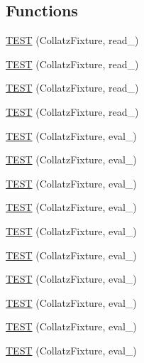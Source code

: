 \subsection*{Functions}
\begin{DoxyCompactItemize}
\item 
\hyperlink{bmk447-TestCollatz_8c_09_09_a66f4163404a0842f4f9eb6dcbfb35580}{T\-E\-S\-T} (Collatz\-Fixture, read\-\_)
\item 
\hyperlink{bmk447-TestCollatz_8c_09_09_a3187ab2baa687bc11ef1402f3c5ac249}{T\-E\-S\-T} (Collatz\-Fixture, read\-\_)
\item 
\hyperlink{bmk447-TestCollatz_8c_09_09_a910fd6352964fadd13f189dfb49f46f4}{T\-E\-S\-T} (Collatz\-Fixture, read\-\_)
\item 
\hyperlink{bmk447-TestCollatz_8c_09_09_a0b5a76cb98b330891857af6177a4ee52}{T\-E\-S\-T} (Collatz\-Fixture, read\-\_)
\item 
\hyperlink{bmk447-TestCollatz_8c_09_09_aa0fcdadaf0d4f7fe0919c37746fe7c74}{T\-E\-S\-T} (Collatz\-Fixture, eval\-\_)
\item 
\hyperlink{bmk447-TestCollatz_8c_09_09_a333bb6921f06fa177e9818dbcf3eda06}{T\-E\-S\-T} (Collatz\-Fixture, eval\-\_)
\item 
\hyperlink{bmk447-TestCollatz_8c_09_09_a251001c75c1226c607534268ab3a5bcb}{T\-E\-S\-T} (Collatz\-Fixture, eval\-\_)
\item 
\hyperlink{bmk447-TestCollatz_8c_09_09_a033aa388470c35adc9579303dba1afa2}{T\-E\-S\-T} (Collatz\-Fixture, eval\-\_)
\item 
\hyperlink{bmk447-TestCollatz_8c_09_09_ab529bbfe532bd0b6fbc11c51fe0af7e5}{T\-E\-S\-T} (Collatz\-Fixture, eval\-\_)
\item 
\hyperlink{bmk447-TestCollatz_8c_09_09_adebb7237f2a00c256cd0c733885ccd58}{T\-E\-S\-T} (Collatz\-Fixture, eval\-\_)
\item 
\hyperlink{bmk447-TestCollatz_8c_09_09_a4428eb890eb2825bcd806812ccf3edc3}{T\-E\-S\-T} (Collatz\-Fixture, eval\-\_)
\item 
\hyperlink{bmk447-TestCollatz_8c_09_09_ad31ddf657ad806c35457117d9a862a43}{T\-E\-S\-T} (Collatz\-Fixture, eval\-\_)
\item 
\hyperlink{bmk447-TestCollatz_8c_09_09_a2e12d9c89f94e5227e499d7703f9dfaa}{T\-E\-S\-T} (Collatz\-Fixture, eval\-\_)
\item 
\hyperlink{bmk447-TestCollatz_8c_09_09_a8857cd942908a7bb202c0fb613a008ce}{T\-E\-S\-T} (Collatz\-Fixture, eval\-\_)
\item 

\end{DoxyCompactItemize}
